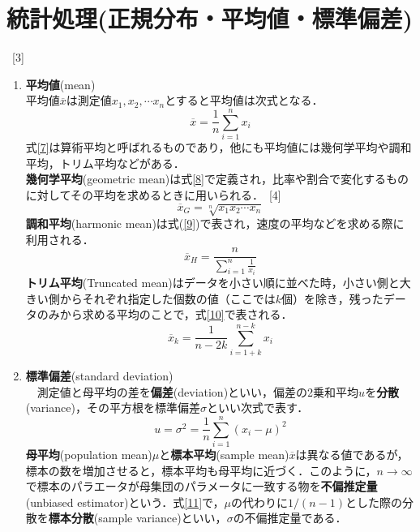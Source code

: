\documentclass[fleqn,dvipdfmx]{jarticle}
\begin{document}
\section{統計処理(正規分布・平均値・標準偏差)}~[3]
\begin{enumerate}
\item \textbf{平均値}(mean)\\
平均値$\overline{x}$は測定値$x_1,x_2,\cdots x_n$とすると平均値は次式となる．
		\begin{equation}
			\label{7}
			\overline{x}=\frac{1}{n}\sum_{i=1}^{n} x_i
		\end{equation}
式\ref{7}は算術平均と呼ばれるものであり，他にも平均値には幾何学平均や調和平均，トリム平均などがある．\\
		\textbf{幾何学平均}(geometric mean)は式\ref{8}で定義され，比率や割合で変化するものに対してその平均を求めるときに用いられる．~[4]
		\begin{equation}
			\label{8}
			\overline{x}_G=\sqrt[n]{x_1x_2\cdots x_n}
		\end{equation}
		\textbf{調和平均}(harmonic mean)は式(\ref{9})で表され，速度の平均などを求める際に利用される．
		\begin{equation}
			\label{9}
			\overline{x}_H=\frac{n}{\sum_{i=1}^n \frac{1}{x_i}}
		\end{equation}
		\textbf{トリム平均}(Truncated mean)はデータを小さい順に並べた時，小さい側と大きい側からそれぞれ指定した個数の値（ここでは$k$個）を除き，残ったデータのみから求める平均のことで，式\ref{10}で表される．
		\begin{equation}
			\overline{x}_k=\frac{1}{n-2k}\sum_{i=1+k}^{n-k} x_i
		\end{equation}

\item \textbf{標準偏差}(standard deviation)\\
　測定値と母平均の差を\textbf{偏差}(deviation)といい，偏差の2乗和平均$u$を\textbf{分散}(variance)，その平方根を標準偏差$\sigma$といい次式で表す．
		\begin{equation}
			\label{11}
			u=\sigma^2=\frac{1}{n}\sum_{i=1}^n (x_i-\mu)^2
		\end{equation}
		\textbf{母平均}(population mean)$\mu$と\textbf{標本平均}(sample mean)$\overline{x}$は異なる値であるが，標本の数を増加させると，標本平均も母平均に近づく．このように，$n \to \infty$で標本のパラエータが母集団のパラメータに一致する物を\textbf{不偏推定量}(unbiased estimator)という．式\ref{11}で，$\mu$の代わりに$1/(n-1)$とした際の分散を\textbf{標本分散}(sample variance)といい，$\sigma$の不偏推定量である．


\end{enumerate}
\end{document}
